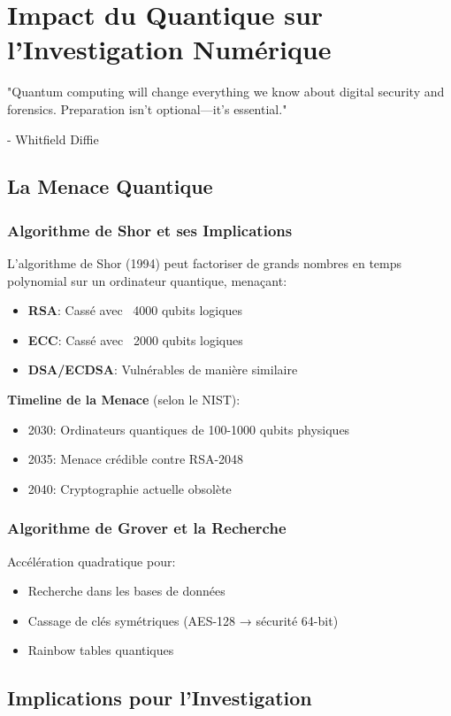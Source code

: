 \chapter{Impact du Quantique sur l'Investigation Numérique}
\epigraph{"Quantum computing will change everything we know about digital security and forensics. Preparation isn't optional—it's essential."}{- Whitfield Diffie}
\section{La Menace Quantique}
\subsection{Algorithme de Shor et ses Implications}
L'algorithme de Shor (1994) peut factoriser de grands nombres en temps polynomial sur un ordinateur quantique, menaçant:

\begin{itemize}
\item \textbf{RSA}: Cassé avec ~4000 qubits logiques
\item \textbf{ECC}: Cassé avec ~2000 qubits logiques
\item \textbf{DSA/ECDSA}: Vulnérables de manière similaire
\end{itemize}

\textbf{Timeline de la Menace} (selon le NIST):

\begin{itemize}
\item 2030: Ordinateurs quantiques de 100-1000 qubits physiques
\item 2035: Menace crédible contre RSA-2048
\item 2040: Cryptographie actuelle obsolète
\end{itemize}

\subsection{Algorithme de Grover et la Recherche}
Accélération quadratique pour:

\begin{itemize}
\item Recherche dans les bases de données
\item Cassage de clés symétriques (AES-128 → sécurité 64-bit)
\item Rainbow tables quantiques
\end{itemize}

\section{Implications pour l'Investigation}
